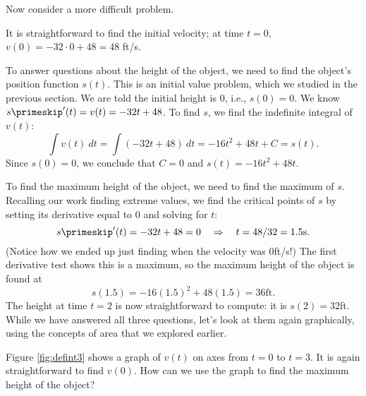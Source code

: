 Now consider a more difficult problem.\\

{It is straightforward to find the initial velocity; at time $t=0$, $v(0) =-32\cdot 0+48 = 48 $ ft/s.

To answer questions about the height of the object, we need to find the object's position function $s(t)$. This is an initial value problem, which we studied in the previous section. We are told the initial height is 0, i.e., $s(0) = 0$. We know $s\primeskip'(t) = v(t) = -32t+48$. To find $s$, we find the indefinite integral of $v(t)$:
		$$\int v(t)\ dt = \int (-32t+48)\ dt = -16t^2+48t+C = s(t).$$
Since $s(0) = 0$, we conclude that $C=0$ and $s(t) = -16t^2+48t$.

To find the maximum height of the object, we need to find the maximum of $s$. Recalling our work finding extreme values, we find the critical points of $s$ by setting its derivative equal to 0 and solving for $t$:
		$$s\primeskip'(t) = -32t+48 = 0 \quad \Rightarrow \quad t=48/32 = 1.5\text{s}.$$
(Notice how we ended up just finding when the velocity was 0ft/s!) The first derivative test shows this is a maximum, so the maximum height of the object is found at $$s(1.5) = -16(1.5)^2+48(1.5)=36\text{ft}.$$
The height at time $t=2$ is now straightforward to compute: it is $s(2) = 32$ft.\\

While we have answered all three questions, let's look at them again graphically, using the concepts of area that we explored earlier.


Figure \ref{fig:defint3} shows a graph of $v(t)$ on axes from $t=0$ to $t=3$. It is again straightforward to find $v(0)$. How can we use the graph to find the maximum height of the object?


}
